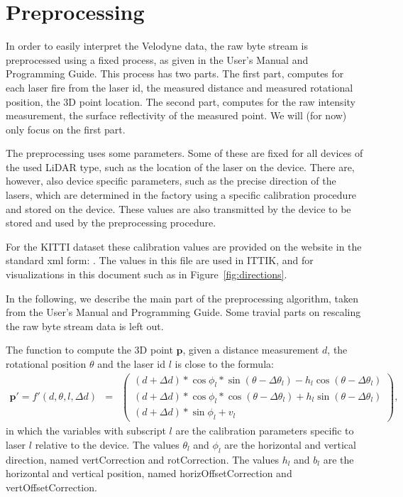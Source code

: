 \documentclass[english]{article}
\begin{document}
\section{Preprocessing}
\label{sec:preproc}
In order to easily interpret the Velodyne data, the raw byte stream is
preprocessed using a fixed process, as given in the User's Manual and
Programming Guide. This process has two parts. The first part, computes for
each laser fire from the laser id, the measured distance and measured
rotational position, the 3D point location. The second part, computes
for the raw intensity measurement, the surface reflectivity of the
measured point. We will (for now) only focus on the first part.

The preprocessing uses some parameters. Some of these are fixed for all
devices of the used LiDAR type, such as the location of the laser on the
device. There are, however, also device specific parameters, such as the
precise direction of the lasers, which are determined in the factory
using a specific calibration procedure and stored on the device. These
values are also transmitted by the device to be stored and used by the
preprocessing procedure.

For the KITTI dataset these calibration values are provided on the
website in the standard xml form:
. The values in
this file are used in ITTIK, and for visualizations in this document
such as in Figure~\ref{fig:directions}.

In the following, we describe the main part of the preprocessing
algorithm, taken from the User's Manual and Programming Guide. Some
travial parts on rescaling the raw byte stream data is left out.

The function to compute the 3D point $\mathbf{p}$, given a distance measurement $d$,
the rotational position $\theta$ and the laser id $l$ is close to
the formula:
\begin{eqnarray}
  \mathbf{p'} =
  f'(d, \theta, l, \Delta d) &=& \left(
           \begin{array}{l}
             (d + \Delta d) * \cos{\phi_l} * \sin(\theta - \Delta \theta_l) - h_l \cos(\theta - \Delta \theta_l) \\
             (d + \Delta d) * \cos{\phi_l} * \cos(\theta - \Delta \theta_l) + h_l \sin(\theta - \Delta \theta_l) \\
             (d + \Delta d) * \sin{\phi_l} + v_l
           \end{array}
         \right),
  \label{eq:ptilde}
\end{eqnarray}
in which the variables with subscript $l$ are the calibration parameters
specific to laser $l$ relative to the device. The values $\theta_l$ and
$\phi_l$ are the horizontal and vertical direction, named vertCorrection
and rotCorrection. The values $h_l$ and $b_l$ are the horizontal and
vertical position, named horizOffsetCorrection and vertOffsetCorrection.
\end{document}
